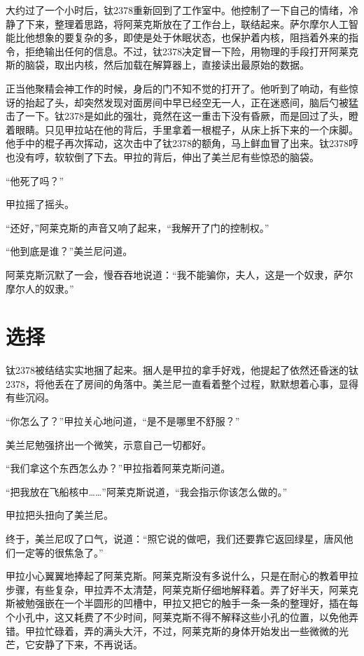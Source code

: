 大约过了一个小时后，钛2378重新回到了工作室中。他控制了一下自己的情绪，冷静了下来，整理着思路，将阿莱克斯放在了工作台上，联结起来。萨尔摩尔人工智能比他想象的要复杂的多，即使是处于休眠状态，也保护着内核，阻挡着外来的指令，拒绝输出任何的信息。不过，钛2378决定冒一下险，用物理的手段打开阿莱克斯的脑袋，取出内核，然后加载在解算器上，直接读出最原始的数据。 

正当他聚精会神工作的时候，身后的门不知不觉的打开了。他听到了响动，有些惊讶的抬起了头，却突然发现对面房间中早已经空无一人，正在迷惑间，脑后勺被猛击了一下。钛2378是如此的强壮，竟然在这一重击下没有昏厥，而是回过了头，瞪着眼睛。只见甲拉站在他的背后，手里拿着一根棍子，从床上拆下来的一个床脚。他手中的棍子再次挥动，这次击中了钛2378的额角，马上鲜血冒了出来。钛2378哼也没有哼，软软倒了下去。甲拉的背后，伸出了美兰尼有些惊恐的脑袋。 

“他死了吗？” 

甲拉摇了摇头。 

“还好，”阿莱克斯的声音又响了起来，“我解开了门的控制权。” 

“他到底是谁？”美兰尼问道。 

阿莱克斯沉默了一会，慢吞吞地说道：“我不能骗你，夫人，这是一个奴隶，萨尔摩尔人的奴隶。” 

\chapter{选择}

钛2378被结结实实地捆了起来。捆人是甲拉的拿手好戏，他提起了依然还昏迷的钛2378，将他丢在了房间的角落中。美兰尼一直看着整个过程，默默想着心事，显得有些沉闷。 

“你怎么了？”甲拉关心地问道，“是不是哪里不舒服？” 

美兰尼勉强挤出一个微笑，示意自己一切都好。 

“我们拿这个东西怎么办？”甲拉指着阿莱克斯问道。 

“把我放在飞船核中……”阿莱克斯说道，“我会指示你该怎么做的。” 

甲拉把头扭向了美兰尼。 

终于，美兰尼叹了口气，说道：“照它说的做吧，我们还要靠它返回绿星，唐风他们一定等的很焦急了。” 

甲拉小心翼翼地捧起了阿莱克斯。阿莱克斯没有多说什么，只是在耐心的教着甲拉步骤，有些复杂，甲拉弄不太清楚，阿莱克斯仔细地解释着。弄了好半天，阿莱克斯被勉强嵌在一个半圆形的凹槽中，甲拉又把它的触手一条一条的整理好，插在每个小孔中，这又耗费了不少时间，阿莱克斯不得不解释这些小孔的位置，以免他弄错。甲拉忙碌着，弄的满头大汗，不过，阿莱克斯的身体开始发出一些微微的光芒，它安静了下来，不再说话。 

